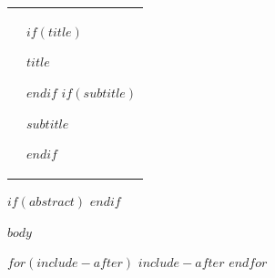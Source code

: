 \documentclass[letterpaper]{article}
\renewcommand{\arraystretch}{0}
\begin{document}
\begin{table}[h!]
 \setlength{\tabcolsep}{0pt}
\def\arraystretch{0}
  \begin{tabular}{m{4cm}m{12cm}}

    &
    \vspace{10pt} 

        $if(title)$
        \begin{center}
        \begin{ejbi-title}
        $title$
        \end{ejbi-title}
        \end{center}
        $endif$ 
        $if(subtitle)$
      \begin{center}
      \begin{ejbi-subtitle}
      $subtitle$
      \end{ejbi-subtitle}
      \end{center}
      $endif$ 
  \end{tabular}
\end{table}


$if(abstract)$
$endif$


$body$
  

$for(include-after)$
$include-after$
$endfor$
  
\vspace{0.5cm}
\end{document}
